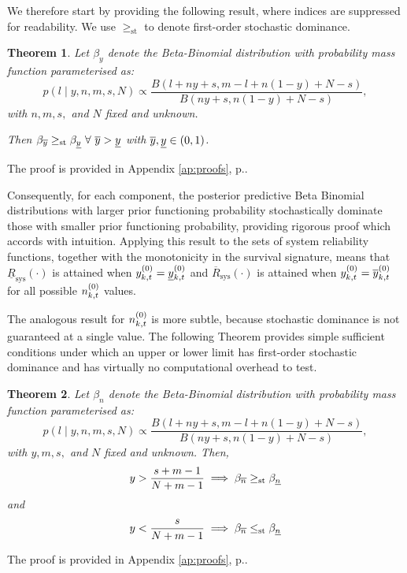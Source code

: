 \documentclass[12pt, a4paper]{elsarticle}
\newtheorem{theorem}{Theorem}
\newcommand{\ul}[1]{\underline{#1}}
\newcommand{\ol}[1]{\overline{#1}}
\newcommand{\lRsys}{\ul{R}_\text{sys}}
\newcommand{\uRsys}{\ol{R}_\text{sys}}
\begin{document}
We therefore start by providing the following result, where indices are suppressed for readability.
We use $\ge_{\mathrm{st}}$ to denote first-order stochastic dominance.

\begin{theorem}
  \label{thm:y}
  Let $\beta_y$ denote the Beta-Binomial distribution with probability mass function parameterised as:
  \[ p(l \mid y, n, m, s, N) \propto \frac{B(l + ny + s, m - l + n(1-y) + N - s)}{B(ny + s, n(1-y) + N - s)}, \]
  with $n, m, s,$ and $N$ fixed and unknown.
  
  Then $\beta_{\yu} \ge_{\mathrm{st}} \beta_{\yl} \ \forall \ \yu > \yl$ with $\yu, \yl \in (0,1)$.
\end{theorem}
The proof is provided in Appendix \ref{ap:proofs}, p.\pageref{prf:y}.

Consequently, for each component, the posterior predictive Beta Binomial distributions 
with larger prior functioning probability stochastically dominate those
with smaller prior functioning probability, providing rigorous proof 
which accords with intuition. Applying this result to the sets of system reliability 
functions, together with the monotonicity in the survival signature, means that
$\lRsys(\cdot)$ is attained when $\yktz = \yktzl$ and $\uRsys(\cdot)$
is attained when $\yktz = \yktzu$ for all possible $n^{(0)}_{k,t}$ values.

The analogous result for $n^{(0)}_{k,t}$ is more subtle, because stochastic 
dominance is not guaranteed at a single value.  The following Theorem 
provides simple sufficient conditions under which an upper or lower 
limit has first-order stochastic dominance and has virtually no 
computational overhead to test.

\begin{theorem}
  \label{thm:n}
  Let $\beta_n$ denote the Beta-Binomial distribution with probability mass function parameterised as:
  \[ p(l \mid y, n, m, s, N) \propto \frac{B(l + ny + s, m - l + n(1-y) + N - s)}{B(ny + s, n(1-y) + N - s)}, \]
  with $y, m, s,$ and $N$ fixed and unknown.  
  Then,
  \[ y > \frac{s + m - 1}{N + m - 1} \implies \beta_{\nu} \ge_{\mathrm{st}} \beta_{\nl} \]
  and 
  \[ y < \frac{s}{N + m - 1} \implies \beta_{\nu} \le_{\mathrm{st}} \beta_{\nl} \]
\end{theorem}
The proof is provided in Appendix \ref{ap:proofs}, p.\pageref{prf:n}.
\end{document}

